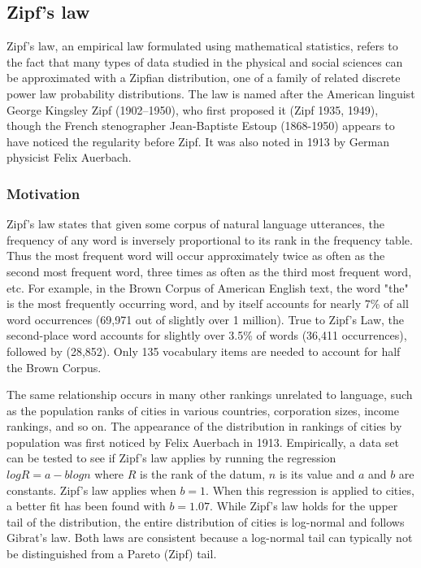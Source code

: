   \subsection{Zipf's law}
  
    Zipf's law, an empirical law formulated using mathematical statistics, refers to the fact that many types of data studied in the physical and social sciences can be approximated with a Zipfian distribution, one of a family of related discrete power law probability distributions. The law is named after the American linguist George Kingsley Zipf (1902–1950), who first proposed it (Zipf 1935, 1949), though the French stenographer Jean-Baptiste Estoup (1868-1950) appears to have noticed the regularity before Zipf.\cite{ManningSchutze1999} It was also noted in 1913 by German physicist Felix Auerbach.\cite{Auerbach1913}
    
    \subsubsection{Motivation}
    
      Zipf's law states that given some corpus of natural language utterances, the frequency of any word is inversely proportional to its rank in the frequency table. Thus the most frequent word will occur approximately twice as often as the second most frequent word, three times as often as the third most frequent word, etc. For example, in the Brown Corpus of American English text, the word "the" is the most frequently occurring word, and by itself accounts for nearly 7\% of all word occurrences (69,971 out of slightly over 1 million). True to Zipf's Law, the second-place word  accounts for slightly over 3.5\% of words (36,411 occurrences), followed by  (28,852). Only 135 vocabulary items are needed to account for half the Brown Corpus.
  
      The same relationship occurs in many other rankings unrelated to language, such as the population ranks of cities in various countries, corporation sizes, income rankings, and so on. The appearance of the distribution in rankings of cities by population was first noticed by Felix Auerbach in 1913.\cite{Auerbach1913} Empirically, a data set can be tested to see if Zipf's law applies by running the regression $log R = a - b log n$ where $R$ is the rank of the datum, $n$ is its value and $a$ and $b$ are constants. Zipf's law applies when $b = 1$. When this regression is applied to cities, a better fit has been found with $b = 1.07$. While Zipf's law holds for the upper tail of the distribution, the entire distribution of cities is log-normal and follows Gibrat's law.\cite{Eeckhout2004} Both laws are consistent because a log-normal tail can typically not be distinguished from a Pareto (Zipf) tail.
    
